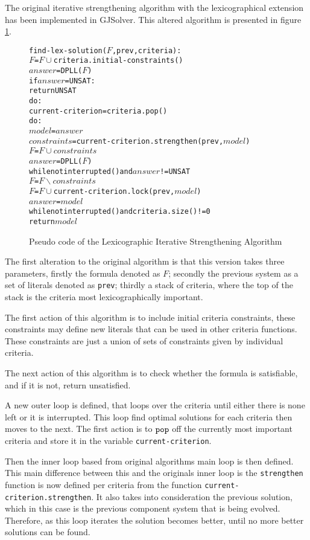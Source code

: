 The original iterative strengthening algorithm with the lexicographical extension has been implemented in GJSolver. 
This altered algorithm is presented in figure \ref{impl.lexstrength}.

\begin{figure}[htp]
\begin{center}
\begin{alltt}
find-lex-solution(\(F\),prev,criteria):
	\(F\) = \(F \cup \) criteria.initial-constraints()
    \(answer\) = DPLL(\(F\))
    if \(answer\) = UNSAT:
        return UNSAT
    do:
        current-criterion = criteria.pop()
        do:
            \(model\) = \(answer\)
            \(constraints\) = current-criterion.strengthen(prev,\(model\))
            \(F\) = \(F \cup constraints\)
            \(answer\) = DPLL(\(F\))
        while not interrupted() and \(answer\) != UNSAT
        \(F\) = \(F \backslash constraints\)
        \(F\) = \(F \cup \) current-criterion.lock(prev,\(model\))
        \(answer\) = \(model\)
    while not interrupted() and criteria.size() != 0
    return \(model\) 
\end{alltt}
  \caption{Pseudo code of the Lexicographic Iterative Strengthening Algorithm}
  \label{impl.lexstrength}
\end{center}
\end{figure}

The first alteration to the original algorithm is that this version takes three parameters, firstly the formula denoted as $F$;
secondly the previous system as a set of literals denoted as \verb+prev+;
thirdly a stack of criteria, where the top of the stack is the criteria most lexicographically important.

The first action of this algorithm is to include initial criteria constraints,
these constraints may define new literals that can be used in other criteria functions.
These constraints are just a union of sets of constraints given by individual criteria. 

The next action of this algorithm is to check whether the formula is satisfiable,
and if it is not, return unsatisfied.

A new outer loop is defined, that loops over the criteria until either there is none left or it is interrupted.
This loop find optimal solutions for each criteria then moves to the next.
The first action is to $\verb+pop+$ off the currently most important criteria and store it in the variable \verb+current-criterion+.

Then the inner loop based from original algorithms main loop is then defined.
This main difference between this and the originals inner loop is the \verb+strengthen+ function is now defined per criteria from the function \verb+current-criterion.strengthen+.
It also takes into consideration the previous solution, which in this case is the previous component system that is being evolved.
Therefore, as this loop iterates the solution becomes better, until no more better solutions can be found.


